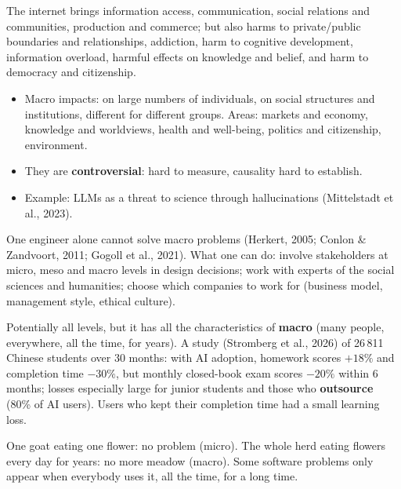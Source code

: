\documentclass[11pt,a4paper,openany]{book}
\begin{document}
\begin{propbox}[title={A double-edged sword (Brey, 2019)}]
The internet brings information access, communication, social relations and communities,
production and commerce; but also harms to private/public boundaries and relationships,
addiction, harm to cognitive development, information overload, harmful effects on knowledge and
belief, and harm to democracy and citizenship.
\begin{itemize}
  \item Macro impacts: on large numbers of individuals, on social structures and institutions,
        different for different groups. Areas: markets and economy, knowledge and worldviews,
        health and well-being, politics and citizenship, environment.
  \item They are \textbf{controversial}: hard to measure, causality hard to establish.
  \item Example: LLMs as a threat to science through hallucinations (Mittelstadt et al., 2023).
\end{itemize}
\end{propbox}

\begin{keybox}[title={The ``problem of one person'' (microethics vs.\ macroethics)}]
One engineer alone cannot solve macro problems (Herkert, 2005; Conlon \& Zandvoort, 2011; Gogoll
et al., 2021). What one can do: involve stakeholders at micro, meso and macro levels in design
decisions; work with experts of the social sciences and humanities; choose which companies to
work for (business model, management style, ethical culture).
\end{keybox}

\begin{exbox}[title={Review question: GenAI and learning}]
Potentially all levels, but it has all the characteristics of \textbf{macro} (many people,
everywhere, all the time, for years). A study (Stromberg et al., 2026) of 26\,811 Chinese
students over 30 months: with AI adoption, homework scores $+18\%$ and completion time $-30\%$,
but monthly closed-book exam scores $-20\%$ within 6 months; losses especially large for junior
students and those who \textbf{outsource} (80\% of AI users). Users who kept their completion
time had a small learning loss.
\end{exbox}

\begin{goatbox}
One goat eating one flower: no problem (micro). The whole herd eating flowers every day for
years: no more meadow (macro). Some software problems only appear when everybody uses it, all
the time, for a long time.
\end{goatbox}
\end{document}
